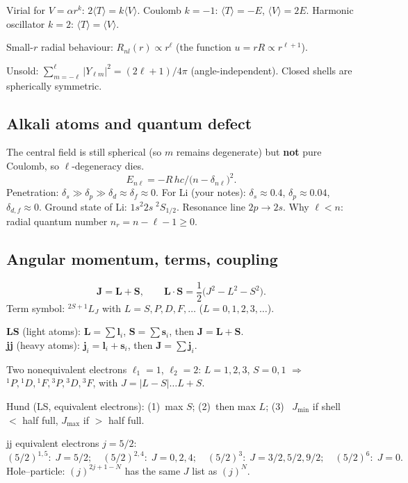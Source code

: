 \documentclass[11pt,a4paper]{article}
\begin{document}
Virial for \(V=\alpha r^k\): \(2\langle T\rangle=k\langle V\rangle\).
Coulomb \(k=-1\): \(\langle T\rangle=-E\), \(\langle V\rangle=2E\).
Harmonic oscillator \(k=2\): \(\langle T\rangle=\langle V\rangle\).

Small-\(r\) radial behaviour: \(R_{nl}(r)\propto r^{\ell}\) (the function \(u=rR\propto r^{\ell+1}\)).

Unsold: \(\sum_{m=-\ell}^{\ell}|Y_{\ell m}|^2=(2\ell+1)/4\pi\) (angle-independent). Closed shells are spherically symmetric.

\subsection{Alkali atoms and quantum defect}
The central field is still spherical (so \(m\) remains degenerate) but \textbf{not} pure Coulomb, so \(\ell\)-degeneracy dies.
\[
E_{n\ell}=-R\,hc\big/\bigl(n-\delta_{n\ell}\bigr)^2.
\]
Penetration: \(\delta_s\gg\delta_p\gg\delta_d\approx\delta_f\approx 0\).
For Li (your notes): \(\delta_s\approx 0.4\), \(\delta_p\approx 0.04\), \(\delta_{d,f}\approx 0\).
Ground state of Li: \(1s^2 2s\;{}^2S_{1/2}\). Resonance line \(2p\to 2s\).
Why \(\ell<n\): radial quantum number \(n_r=n-\ell-1\ge 0\).

\subsection{Angular momentum, terms, coupling}
\[
\mathbf{J}=\mathbf{L}+\mathbf{S},\qquad
\mathbf{L}\cdot\mathbf{S}=\frac12\bigl(J^2-L^2-S^2\bigr).
\]
Term symbol: \({}^{2S+1}L_J\) with \(L=S,P,D,F,\ldots\) (\(L=0,1,2,3,\ldots\)).

\textbf{LS} (light atoms): \(\mathbf{L}=\sum\mathbf{l}_i\), \(\mathbf{S}=\sum\mathbf{s}_i\), then \(\mathbf{J}=\mathbf{L}+\mathbf{S}\).\\
\textbf{jj} (heavy atoms): \(\mathbf{j}_i=\mathbf{l}_i+\mathbf{s}_i\), then \(\mathbf{J}=\sum\mathbf{j}_i\).

Two nonequivalent electrons \(\ell_1=1\), \(\ell_2=2\):
\(L=1,2,3\), \(S=0,1\) \(\Rightarrow\) \({}^1P,{}^1D,{}^1F,{}^3P,{}^3D,{}^3F\),
with \(J=|L-S|\ldots L+S\).

Hund (LS, equivalent electrons): (1)~max \(S\); (2)~then max \(L\); (3)~ \(J_{\min}\) if shell \(<\) half full, \(J_{\max}\) if \(>\) half full.

jj equivalent electrons \(j=5/2\):
\[
(5/2)^{1,5}:\;J=5/2;\quad
(5/2)^{2,4}:\;J=0,2,4;\quad
(5/2)^3:\;J=3/2,5/2,9/2;\quad
(5/2)^6:\;J=0.
\]
Hole--particle: \((j)^{2j+1-N}\) has the same \(J\) list as \((j)^N\).
\end{document}
